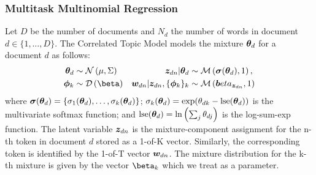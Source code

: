 %
%
%
%

\subsubsection{Multitask Multinomial Regression}
Let $D$ be the number of documents and $N_d$ the number of words in document $d\in\{1,\ldots,D\}$. The Correlated Topic Model models the mixture ${ \bm \theta_d }$ for a document $d$ as follows:
\begin{align}
\thd &\sim \nor{\mu}{\Sigma}
&\zdn | \thd &\sim \muln {\vv{\sigma}(\thd)}{1} ,\\
\pk &\sim\dir{\vv{\beta}}
&\wdn | \zdn , \{\pk\}_k &\sim \muln{\vv{beta}_{\zdn}}{1}
\end{align}
where $\bm \sigma({ \bm \theta_d }) = \{\sigma_1({ \bm \theta_d }), \ldots, \sigma_k({ \bm \theta_d })\}$; $\sigma_k({ \bm \theta_d }) = \exp({ \theta_{dk} } - \text{lse}({ \bm \theta_d }))$ is the multivariate softmax function; and $\text{lse}({ \bm \theta_d }) = \ln\left(\sum_j { \theta_{dj} } \right)$ is the log-sum-exp function. The latent variable ${ \bm z_{dn} }$ is the mixture-component assignment for the n-th token in document $d$ stored as a 1-of-K vector. Similarly, the corresponding token is identified by the 1-of-T vector ${ \bm w_{dn} }$. The mixture distribution for the k-th mixture is given by the vector $\vv{\beta}_k$ which we treat as a parameter.

